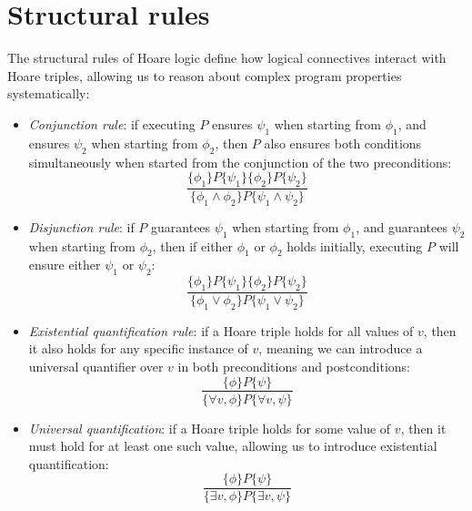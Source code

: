 \section{Structural rules}

The structural rules of Hoare logic define how logical connectives interact with Hoare triples, allowing us to reason about complex program properties systematically:
\begin{itemize}
    \item \textit{Conjunction rule}: if executing $P$ ensures $\psi_1$ when starting from $\phi_1$, and ensures $\psi_2$ when starting from $\phi_2$, then $P$ also ensures both conditions simultaneously when started from the conjunction of the two preconditions:
        \[\dfrac{\{\phi_1\}P\{\psi_1\}\{\phi_2\}P\{\psi_2\}}{\{\phi_1\land\phi_2\}P\{\psi_1\land\psi_2\}}\]
    \item \textit{Disjunction rule}: if $P$ guarantees $\psi_1$ when starting from $\phi_1$, and guarantees $\psi_2$ when starting from $\phi_2$, then if either $\phi_1$ or $\phi_2$ holds initially, executing $P$ will ensure either $\psi_1$ or $\psi_2$: 
        \[\dfrac{\{\phi_1\}P\{\psi_1\}\{\phi_2\}P\{\psi_2\}}{\{\phi_1\lor\phi_2\}P\{\psi_1\lor\psi_2\}}\]
    \item \textit{Existential quantification rule}: if a Hoare triple holds for all values of $v$, then it also holds for any specific instance of $v$, meaning we can introduce a universal quantifier over $v$ in both preconditions and postconditions: 
        \[\dfrac{\{\phi\}P\{\psi\}}{\{\forall v,\phi\}P\{\forall v,\psi\}}\]
    \item \textit{Universal quantification}: if a Hoare triple holds for some value of $v$, then it must hold for at least one such value, allowing us to introduce existential quantification:
        \[\dfrac{\{\phi\}P\{\psi\}}{\{\exists v,\phi\}P\{\exists v,\psi\}}\]
\end{itemize}